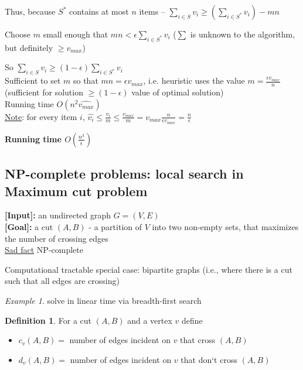 \documentclass[a4paper,12pt]{article}
\theoremstyle{plain}
\theoremstyle{definition}
\newtheorem*{definition}{Definition}
\theoremstyle{remark}
\newtheorem*{example}{Example}
\begin{document}
Thus, because $S^*$ contains at most $n$ items -- $\sum\limits_{i \in S} v_i \geq (\sum\limits_{i \in S^*} v_i) - mn$

Choose $m$ small enough that $mn < \epsilon \sum\limits_{i \in S^*} v_i$ ($\sum$ is unknown to the algorithm, but definitely $\geq v_{max}$)

So $\sum\limits_{i \in S} v_i \geq (1 - \epsilon) \sum\limits_{i \in S^*} v_i$
\\

Sufficient to set $m$ so that \underline{$mn = \epsilon v_{max}$}, i.e. heuristic uses the value $m = \frac{\epsilon v_{max}}{n}$ (sufficient for solution $\geq (1 - \epsilon)$ value of optimal solution)
\\

Running time $O(n^2 \widehat{v_{max}})$
\\

\underline{Note}: for every item $i$, $\widehat{v_i} \leq \frac{v_i}{m} \leq \frac{v_{max}}{m} = v_{max} \frac{n}{\epsilon v_{max}} = \frac {n}{\epsilon}$

\textbf{Running time $O(\frac{n^3}{\epsilon})$}



\subsection{NP-complete problems: local search in Maximum cut problem}
\textbf{[Input]:} an undirected graph $G = (V, E)$
\\

\textbf{[Goal]:} a cut $(A, B)$ - a partition of $V$ into two non-empty sets, that maximizes the number of crossing edges
\\

\underline{Sad fact} NP-complete

Computational tractable special case: bipartite graphs (i.e., where there is a cut such that all edges are crossing)

\begin{example}solve in linear time via breadth-first search\end{example}

\begin{definition}
For a cut $(A, B)$ and a vertex $v$ define
\begin{itemize}
	\item $c_v(A, B) =$ number of edges incident on $v$ that cross $(A, B)$
	\item $d_v(A, B) =$ number of edges incident on $v$ that don`t cross $(A, B)$
\end{itemize}
\end{definition}
\end{document}
